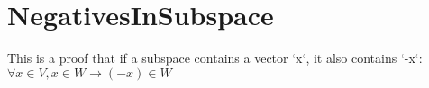 \section{NegativesInSubspace}

\begin{theorem}
  \label{theorem : subspace_neg}
  \leanok
  This is a proof that if a subspace contains a vector `x`, it also contains `-x`:$ \forall x \in V, x \in W \rightarrow (-x) \in W$
\end{theorem}
